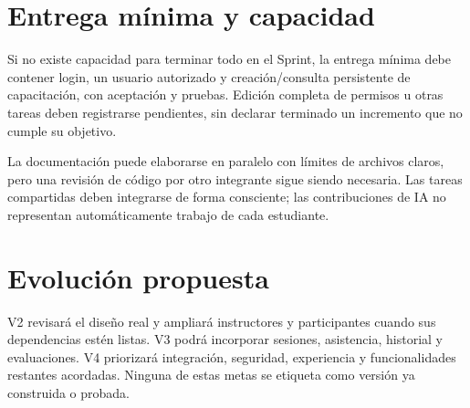 \section{Entrega mínima y capacidad}
Si no existe capacidad para terminar todo en el Sprint, la entrega mínima debe contener login, un usuario autorizado y creación/consulta persistente de capacitación, con aceptación y pruebas. Edición completa de permisos u otras tareas deben registrarse pendientes, sin declarar terminado un incremento que no cumple su objetivo.

La documentación puede elaborarse en paralelo con límites de archivos claros, pero una revisión de código por otro integrante sigue siendo necesaria. Las tareas compartidas deben integrarse de forma consciente; las contribuciones de IA no representan automáticamente trabajo de cada estudiante.

\section{Evolución propuesta}
V2 revisará el diseño real y ampliará instructores y participantes cuando sus dependencias estén listas. V3 podrá incorporar sesiones, asistencia, historial y evaluaciones. V4 priorizará integración, seguridad, experiencia y funcionalidades restantes acordadas. Ninguna de estas metas se etiqueta como versión ya construida o probada.
